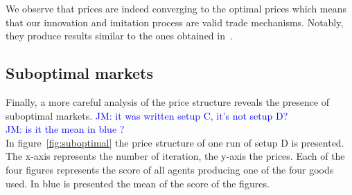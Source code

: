 \documentclass{wscpaperproc}
\newcommand{\memo}[2]{\textcolor{#1}{#2}}
\newcommand{\jm}[1]{\memo{blue}{JM: #1\\}}
\begin{document}
We observe that prices are indeed converging to the optimal prices which means that our innovation and imitation process are valid trade mechanisms. Notably, they produce results similar to the ones obtained in~\cite{gintis_emergence_2006}.

\subsection{Suboptimal markets}

Finally, a more careful analysis of the price structure reveals the presence of suboptimal markets. 
\jm{it was written setup C, it's not setup D?}
\jm{is it the mean in blue ?}
In figure~\ref{fig:suboptimal} the price structure of one run of setup D is presented. The x-axis represents the number of iteration, the y-axis the prices. Each of the four figures represents the score of all agents producing one of the four goods used. In blue is presented the mean of the score of the figures.

\end{document}
